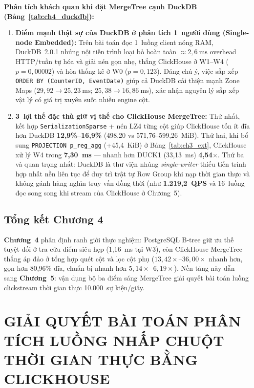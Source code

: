 \documentclass[13pt,a4paper]{report}
\begin{document}
\noindent\textbf{Phân tích khách quan khi đặt MergeTree cạnh DuckDB (Bảng~\ref{tab:ch4_duckdb}):}
\begin{enumerate}
    \setlength{\itemsep}{2pt}\setlength{\parskip}{0pt}
    \item \textbf{Điểm mạnh thật sự của DuckDB ở phân tích 1~người dùng (Single-node Embedded):} Trên bài toán đọc 1~luồng client nóng RAM, DuckDB~2.0.1 nhúng nội tiến trình loại bỏ hoàn toàn $\approx 2{,}6~\text{ms}$ overhead HTTP/tuần tự hóa và giải nén gọn nhẹ, thắng ClickHouse ở W1--W4 ($p = 0{,}00002$) và hòa thống kê ở W0 ($p = 0{,}123$). Đáng chú ý, việc sắp xếp \texttt{ORDER BY (\allowbreak{}CounterID, EventDate)} giúp cả DuckDB cải thiện mạnh Zone Maps ($29{,}92 \rightarrow 25{,}23~\text{ms}$; $25{,}38 \rightarrow 16{,}86~\text{ms}$), xác nhận nguyên lý sắp xếp vật lý có giá trị xuyên suốt nhiều engine cột.
    \item \textbf{3~lợi thế đặc thù giữ vị thế cho ClickHouse MergeTree:} Thứ nhất, kết hợp \texttt{SerializationSparse} + nén LZ4 từng cột giúp ClickHouse tốn ít đĩa hơn DuckDB \textbf{12,9\%--16,9\%} (498,20 vs 571,76--599,26~MiB). Thứ hai, khi bổ sung \texttt{PROJECTION p\_\allowbreak{}reg\_\allowbreak{}agg} (+45,4~KiB) ở Bảng~\ref{tab:ch3_ext}, ClickHouse xử lý W4 trong \textbf{7,30~ms} --- nhanh hơn DUCK1 (33,13~ms) \textbf{4,54${\times}$}. Thứ ba và quan trọng nhất: DuckDB là thư viện nhúng \textit{single-writer} thiếu tiến trình hợp nhất nền liên tục để duy trì trật tự Row Group khi nạp thời gian thực và không gánh hàng nghìn truy vấn đồng thời (như \textbf{1.219,2~QPS} và 16~luồng đọc song song khi stream của ClickHouse ở Chương~5).
\end{enumerate}



\section{Tổng kết Chương 4}
\textbf{Chương~4} phân định ranh giới thực nghiệm: PostgreSQL B-tree giữ ưu thế tuyệt đối ở tra cứu điểm siêu hẹp (1,16~ms tại W3), còn ClickHouse MergeTree thắng áp đảo ở tổng hợp quét cột và lọc cột phụ ($13{,}42{\times}\text{--}36{,}00{\times}$ nhanh hơn, gọn hơn 80,96\% đĩa, chuẩn bị nhanh hơn $5{,}14{\times}\text{--}6{,}19{\times}$). Nền tảng này dẫn sang \textbf{Chương~5}: vận dụng bộ ba điểm sáng MergeTree giải quyết bài toán luồng clickstream thời gian thực 10.000~sự kiện/giây.

\chapter{GIẢI QUYẾT BÀI TOÁN PHÂN TÍCH LUỒNG NHẤP CHUỘT THỜI GIAN THỰC BẰNG CLICKHOUSE}
\end{document}
